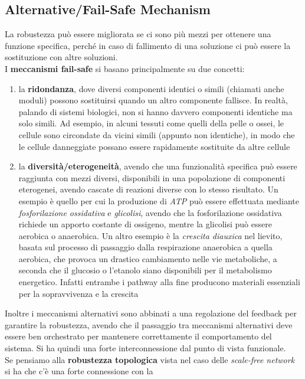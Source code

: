 \documentclass[a4paper,12pt, oneside]{book}
\begin{document}
\subsection{Alternative/Fail-Safe Mechanism}
La robustezza può essere migliorata se ci sono più mezzi per ottenere una
funzione specifica, perché in caso di fallimento di una soluzione ci può essere
la sostituzione con altre soluzioni. \\
I \textbf{meccanismi fail-safe} si basano principalmente su due concetti:
\begin{enumerate}
  \item la \textbf{ridondanza}, dove diversi componenti identici o simili
  (chiamati anche moduli) possono sostituirsi quando un altro componente
  fallisce. In realtà, palando di sistemi biologici, non si hanno davvero
  componenti identiche ma solo simili. Ad esempio, in alcuni tessuti come quelli
  della pelle o ossei, le cellule sono circondate da vicini simili (appunto non
  identiche), in modo che 
  le cellule danneggiate possano essere rapidamente sostituite da altre cellule 
  \item la \textbf{diversità/eterogeneità}, avendo che una funzionalità
  specifica può essere raggiunta con mezzi diversi, disponibili in una
  popolazione di componenti eterogenei, avendo cascate di reazioni diverse con
  lo stesso risultato. Un esempio è quello per cui la produzione di \textit{ATP}
  può essere effettuata mediante \textit{fosforilazione ossidativa} e
  \textit{glicolisi}, avendo che la fosforilazione ossidativa richiede un
  apporto costante di ossigeno, mentre la glicolisi può essere aerobica o
  anaerobica. Un altro esempio è la \textit{crescita diauxica} nel lievito,
  basata sul processo di passaggio dalla respirazione anaerobica a quella
  aerobica, che provoca un 
  drastico cambiamento nelle vie metaboliche, a seconda che il glucosio o
  l'etanolo siano disponibili per il metabolismo energetico. Infatti entrambe i
  pathway alla fine producono materiali essenziali per la sopravvivenza e la
  crescita 
\end{enumerate}
Inoltre i meccanismi alternativi sono abbinati a una regolazione del feedback
per garantire la robustezza, avendo che il passaggio tra meccanismi alternativi
deve essere ben orchestrato per mantenere correttamente il comportamento del
sistema. Si ha quindi una forte interconnessione dal punto di vista
funzionale.\\
Se pensiamo alla \textbf{robustezza topologica} vista nel caso delle
\textit{scale-free network} si ha che c'è una forte connessione con la
\end{document}
